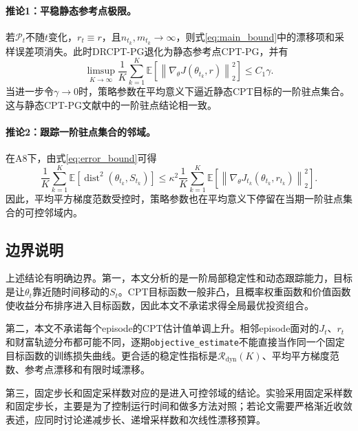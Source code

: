 \documentclass{sufethesismas}
\begin{document}
\paragraph{推论1：平稳静态参考点极限。}
若$\mathcal{P}_t$不随$t$变化，$r_t\equiv r$，且$n_{t_k},m_{t_k}\to\infty$，则式\eqref{eq:main_bound}中的漂移项和采样误差项消失。此时DRCPT-PG退化为静态参考点CPT-PG，并有
\begin{equation}
\label{eq:stationary_corollary}
\limsup_{K\to\infty}
\frac{1}{K}
\sum_{k=1}^{K}
\mathbb{E}
\left[
\left\|
\nabla_\theta J(\theta_{t_k},r)
\right\|_2^2
\right]
\le
C_1\gamma.
\end{equation}
当进一步令$\gamma\to0$时，策略参数在平均意义下逼近静态CPT目标的一阶驻点集合。这与静态CPT-PG文献中的一阶驻点结论相一致\citep{lepel2026policygradients}。

\paragraph{推论2：跟踪一阶驻点集合的邻域。}
在A8下，由式\eqref{eq:error_bound}可得
\begin{equation}
\label{eq:distance_bound}
\frac{1}{K}
\sum_{k=1}^{K}
\mathbb{E}
\left[
\operatorname{dist}^2(\theta_{t_k},S_{t_k})
\right]
\le
\kappa^2
\frac{1}{K}
\sum_{k=1}^{K}
\mathbb{E}
\left[
\left\|
\nabla_\theta J_{t_k}(\theta_{t_k},r_{t_k})
\right\|_2^2
\right].
\end{equation}
因此，平均平方梯度范数受控时，策略参数也在平均意义下停留在当期一阶驻点集合的可控邻域内。

\subsection{边界说明}

上述结论有明确边界。第一，本文分析的是一阶局部稳定性和动态跟踪能力，目标是让$\theta_t$靠近随时间移动的$S_t$。CPT目标函数一般非凸，且概率权重函数和价值函数使收益分布排序进入目标函数，因此本文不承诺求得全局最优投资组合。

第二，本文不承诺每个episode的CPT估计值单调上升。相邻episode面对的$J_t$、$r_t$和财富轨迹分布都可能不同，逐期\texttt{objective\_estimate}不能直接当作同一个固定目标函数的训练损失曲线。更合适的稳定性指标是$\mathcal{R}_{\mathrm{dyn}}(K)$、平均平方梯度范数、参考点漂移和有限时域漂移。

第三，固定步长和固定采样数对应的是进入可控邻域的结论。实验采用固定采样数和固定步长，主要是为了控制运行时间和做多方法对照；若论文需要严格渐近收敛表述，应同时讨论递减步长、递增采样数和次线性漂移预算。
\end{document}
